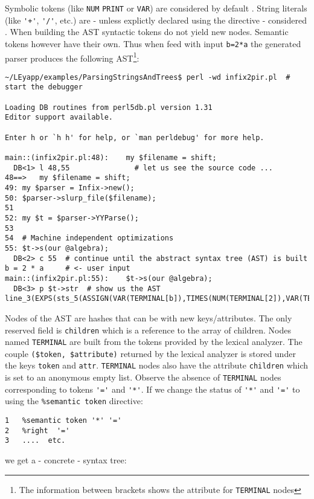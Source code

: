 Symbolic tokens (like \verb|NUM|
\verb|PRINT| or \verb|VAR|) 
are considered by default . 
String literals 
(like \verb|'+'|, \verb|'/'|, etc.)
are - unless explictly 
declared using the  directive - 
considered .
When building the AST syntactic tokens do not yield 
new nodes.
Semantic tokens however have their own. Thus
when feed with input \verb|b=2*a| 
the generated parser
produces the following AST\footnote{The information
between brackets shows the attribute 
for {\tt TERMINAL} nodes}:
\begin{verbatim}
~/LEyapp/examples/ParsingStringsAndTrees$ perl -wd infix2pir.pl  # start the debugger

Loading DB routines from perl5db.pl version 1.31
Editor support available.

Enter h or `h h' for help, or `man perldebug' for more help.

main::(infix2pir.pl:48):    my $filename = shift;
  DB<1> l 48,55               # let us see the source code ...
48==>   my $filename = shift;
49: my $parser = Infix->new(); 
50: $parser->slurp_file($filename);
51  
52: my $t = $parser->YYParse();
53  
54  # Machine independent optimizations
55: $t->s(our @algebra);  
  DB<2> c 55  # continue until the abstract syntax tree (AST) is built
b = 2 * a     # <- user input
main::(infix2pir.pl:55):    $t->s(our @algebra);  
  DB<3> p $t->str  # show us the AST
line_3(EXPS(sts_5(ASSIGN(VAR(TERMINAL[b]),TIMES(NUM(TERMINAL[2]),VAR(TERMINAL[a]))))))
\end{verbatim}
Nodes of the AST are hashes that can be 
 with new keys/attributes.
The only reserved field is \verb|children| which is a reference to the
array of children. 
Nodes named \verb|TERMINAL| are built from the
tokens provided by the lexical analyzer. 
The couple \verb|($token, $attribute)| returned by the lexical analyzer
is stored under the keys \verb|token| and \verb|attr|.
\verb|TERMINAL| nodes also have the attribute \verb|children| which is
set to an anonymous empty list.
Observe the absence of \verb|TERMINAL| nodes corresponding to 
tokens \verb|'='| and \verb|'*'|.
If we change the status of \verb|'*'| and \verb|'='| 
to  using the \verb|%semantic token| directive:
\begin{verbatim}
1   %semantic token '*' '='
2   %right  '='
3   ....  etc.
\end{verbatim}
we get a - concrete - syntax tree:
